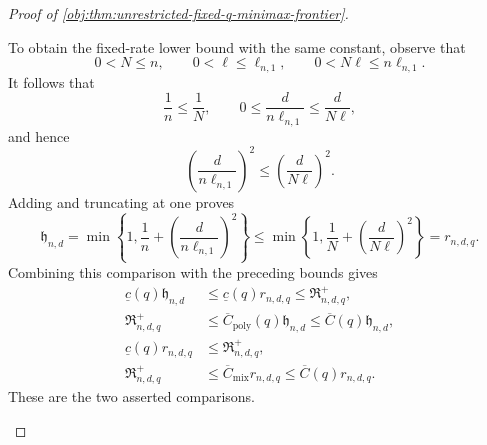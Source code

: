 \begin{proof}[Proof of \cref{obj:thm:unrestricted-fixed-q-minimax-frontier}]
\begin{enumerate}
To obtain the fixed-rate lower bound with the same constant, observe that
\[
0<N\le n,
\qquad
0<\ell\le\ell_{n,1},
\qquad
0<N\ell\le n\ell_{n,1}.
\]
It follows that
\[
\frac1n\le\frac1N,
\qquad
0\le\frac{d}{n\ell_{n,1}}\le\frac{d}{N\ell},
\]
and hence
\[
\left(\frac{d}{n\ell_{n,1}}\right)^2
\le
\left(\frac{d}{N\ell}\right)^2.
\]
Adding and truncating at one proves
\[
\mathfrak h_{n,d}
=
\min\left\{1,\frac1n+
\left(\frac{d}{n\ell_{n,1}}\right)^2\right\}
\le
\min\left\{1,\frac1N+
\left(\frac{d}{N\ell}\right)^2\right\}
=r_{n,d,q}.
\]
Combining this comparison with the preceding bounds gives
\[
\begin{aligned}
\underline c(q)\mathfrak h_{n,d}
&\le \underline c(q)r_{n,d,q}
 \le\mathfrak R^+_{n,d,q},\\
\mathfrak R^+_{n,d,q}
&\le\overline C_{\mathrm{poly}}(q)\mathfrak h_{n,d}
 \le\overline C(q)\mathfrak h_{n,d},\\
\underline c(q)r_{n,d,q}
&\le\mathfrak R^+_{n,d,q},\\
\mathfrak R^+_{n,d,q}
&\le\overline C_{\mathrm{mix}}r_{n,d,q}
 \le\overline C(q)r_{n,d,q}.
\end{aligned}
\]
These are the two asserted comparisons.
\end{enumerate}
\end{proof}

